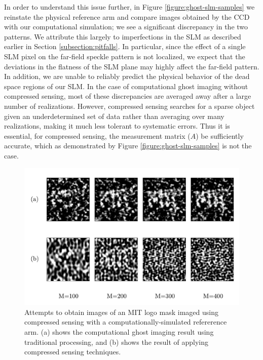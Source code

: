 In order to understand this issue further, in Figure \ref{figure:ghost-slm-samples} we reinstate the physical reference arm and compare images obtained by the CCD with our computational simulation; we see a significant discrepancy in the two patterns. We attribute this largely to imperfections in the SLM as described earlier in Section \ref{subsection:pitfalls}. In particular, since the effect of a single SLM pixel on the far-field speckle pattern is not localized, we expect that the deviations in the flatness of the SLM plane may highly affect the far-field pattern. In addition, we are unable to reliably predict the physical behavior of the dead space regions of our SLM. In the case of computational ghost imaging without compressed sensing, most of these discrepancies are averaged away after a large number of realizations. However, compressed sensing searches for a sparse object given an underdetermined set of data rather than averaging over many realizations, making it much less tolerant to systematic errors. Thus it is essential, for compressed sensing, the measurement matrix ($A$) be sufficiently accurate, which as demonstrated by Figure \ref{figure:ghost-slm-samples} is not the case.

\begin{figure}[t]
\begin{center}
\includegraphics[width=15cm]{figure-ghost-compressed-czl1.pdf}
\caption{Attempts to obtain images of an MIT logo mask imaged using compressed sensing with a computationally-simulated refererence arm. (a) shows the computational ghost imaging result using traditional processing, and (b) shows the result of applying compressed sensing techniques.}
\label{figure:ghost-compressed-czl1}
\end{center}
\end{figure}

